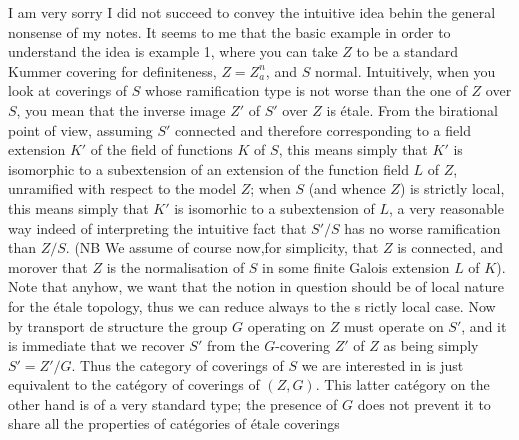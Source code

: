 I am very sorry I did not succeed to convey the intuitive idea behin the general nonsense of my notes. It seems to me that the basic example in order to understand the idea is example 1, where you can take $Z$ to be a standard Kummer covering for definiteness, $Z=Z_a^n$, and $S$ normal. Intuitively, when you look at coverings  of $S$ whose ramification type is not worse than the one of $Z$ over $S$, you mean that the  inverse image $Z'$ of $S'$ over $Z$ is étale.  From the birational point of view, assuming $S'$ connected and therefore corresponding to a field extension $K'$ of the field of functions $K$ of $S$, this means simply that $K'$ is isomorphic to a subextension of an extension  of the function field $L$ of $Z$, unramified with respect to the model $Z$; when $S$ (and whence $Z$) is strictly local,  this means simply that $K'$ is isomorhic to a subextension of $L$, a very reasonable way indeed of interpreting the intuitive fact that $S'/S$ has no worse ramification than $Z/S$. (NB We assume of course now,for simplicity, that $Z$ is connected, and morover that $Z$ is the normalisation of $S$ in some finite Galois extension $L$ of $K$). Note that anyhow, we want that the notion in question should be of local nature for the étale topology, thus we can reduce always to the s rictly local case. Now by transport de structure the group $G$ operating on $Z$ must operate on $S'$, and it is immediate that we recover $S'$ from the $G$-covering $Z'$ of $Z$ as being simply $S'=Z'/G$. Thus  the category of coverings of $S$ we are interested in is just equivalent to the catégory of  coverings of $(Z,G)$. This latter catégory on the other hand is of a very standard type; the presence of $G$ does not prevent it to share all the properties of catégories of étale coverings
